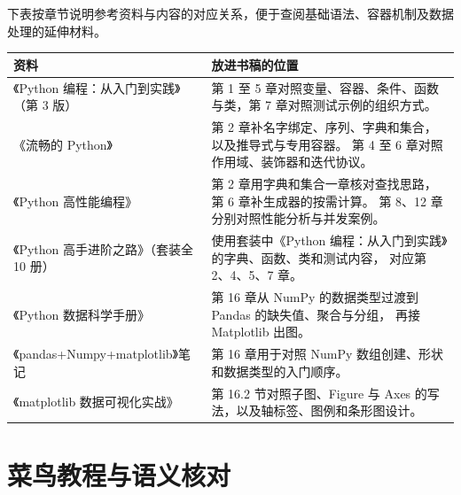\documentclass[UTF8,a4paper,oneside,openany,fontset=none,11pt]{ctexbook}
\begin{document}
下表按章节说明参考资料与内容的对应关系，便于查阅基础语法、容器机制及数据处理的延伸材料。

\begin{tabularx}{\textwidth}{@{}>{\raggedright\arraybackslash}p{}
                               >{\raggedright\arraybackslash}X@{}}
  \toprule
  \textbf{资料} & \textbf{放进书稿的位置} \\
  \midrule
  《Python 编程：从入门到实践》（第 3 版） &
    第 1 至 5 章对照变量、容器、条件、函数与类，第 7 章对照测试示例的组织方式。 \\[4pt]
  《流畅的 Python》 &
    第 2 章补名字绑定、序列、字典和集合，以及推导式与专用容器。
    第 4 至 6 章对照作用域、装饰器和迭代协议。 \\[4pt]
  《Python 高性能编程》 &
    第 2 章用字典和集合一章核对查找思路，第 6 章补生成器的按需计算。
    第 8、12 章分别对照性能分析与并发案例。 \\[4pt]
  《Python 高手进阶之路》（套装全 10 册） &
    使用套装中《Python 编程：从入门到实践》的字典、函数、类和测试内容，
    对应第 2、4、5、7 章。 \\[4pt]
  《Python 数据科学手册》 &
    第 16 章从 NumPy 的数据类型过渡到 Pandas 的缺失值、聚合与分组，
    再接 Matplotlib 出图。 \\[4pt]
  《pandas+Numpy+matplotlib》笔记 &
    第 16 章用于对照 NumPy 数组创建、形状和数据类型的入门顺序。 \\[4pt]
  《matplotlib 数据可视化实战》 &
    第 16.2 节对照子图、Figure 与 Axes 的写法，以及轴标签、图例和条形图设计。 \\
  \bottomrule
\end{tabularx}\par

\section*{菜鸟教程与语义核对}
\end{document}
